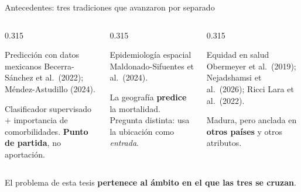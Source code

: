 \documentclass[aspectratio=169,11pt]{beamer}
\newcommand{\resalta}[1]{{\color{vino}\bfseries #1}}
\begin{document}
\begin{frame}{Antecedentes: tres tradiciones que avanzaron por separado}
  \vspace{0.8em}
  \begin{columns}[T,onlytextwidth]
    \begin{column}{0.315\textwidth}
      \begin{block}{\small Predicción con datos mexicanos}
        \footnotesize
        Becerra-Sánchez et al.\ (2022); Méndez-Astudillo (2024).

        \vspace{0.3em}
        Clasificador supervisado $+$ importancia de comorbilidades.
        \resalta{Punto de partida}, no aportación.
      \end{block}
    \end{column}
    \begin{column}{0.315\textwidth}
      \begin{block}{\small Epidemiología espacial}
        \footnotesize
        Maldonado-Sifuentes et al.\ (2024).

        \vspace{0.3em}
        La geografía \resalta{predice} la mortalidad. Pregunta distinta: usa la
        ubicación como \textit{entrada}.
      \end{block}
    \end{column}
    \begin{column}{0.315\textwidth}
      \begin{block}{\small Equidad en salud}
        \footnotesize
        Obermeyer et al.\ (2019); Nejadshamsi et al.\ (2026); Ricci Lara et al.\
        (2022).

        \vspace{0.3em}
        Madura, pero anclada en \resalta{otros países} y otros atributos.
      \end{block}
    \end{column}
  \end{columns}

  \vspace{1.0em}
  \begin{center}
  \begin{minipage}{0.88\textwidth}
    \begin{block}{}
      \centering
      El problema de esta tesis \resalta{pertenece al ámbito en el que las tres
      se cruzan}.
    \end{block}
  \end{minipage}
  \end{center}
\end{frame}
\end{document}

